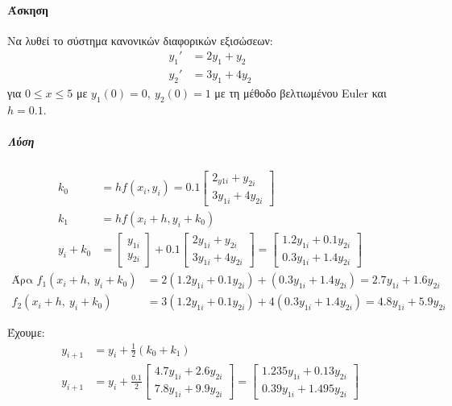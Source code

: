 \documentclass[11pt,a4paper,notitlepage,fleqn]{article}
\begin{document}
\paragraph{Άσκηση}
Να λυθεί το σύστημα κανονικών διαφορικών εξισώσεων:
\begin{align*}
	y_1' &= 2y_1 + y_2 \\
	y_2' &= 3y_1 + 4y_2
\end{align*} για \( 0 \leq x \leq 5 \) με \( y_1(0)=0,\ y_2(0)=1 \)
με τη μέθοδο βελτιωμένου Euler και \( h=0.1 \).
\subparagraph{Λύση}
\begin{align*}
	k_0 &= hf(x_i,y_i) = 0.1\left[\begin{matrix}
	2_{y1i}+y_{2i} \\
	3y_{1i}+4y_{2i}
	\end{matrix}\right] \\
	k_1 &= hf(x_i+h,y_i+k_0) \\
	y_i + k_0 &= \left[\begin{matrix}
	y_{1i}\\ y_{2i}
	\end{matrix}\right] + 0.1\left[\begin{matrix}
	2y_{1i} + y_{2i}\\
	3y_{1i}+4y_{2i}
	\end{matrix}\right] = \left[\begin{matrix}
	1.2y_{1i} + 0.1y_{2i}\\
	0.3y_{1i} + 1.4y_{2i}
	\end{matrix}\right]
\end{align*}
\begin{align*}
	\text{Άρα } f_1(x_i+h,\ y_i+k_0) &=
	2(1.2y_{1i}+0.1y_{2i}) + (0.3y_{1i}+1.4y_{2i}) =
	2.7y_{1i} + 1.6y_{2i} \\
	f_2(x_i+h,\ y_i+k_0) &=
	3(1.2y_{1i}+0.1y_{2i}) + 4(0.3y_{1i}+1.4y_{2i}) =
	4.8y_{1i}+5.9y_{2i}
\end{align*}

Έχουμε:
\begin{align*}
	y_{i+1} &= y_i + \frac{1}{2}(k_0+k_1)
	\\ y_{i+1} &= y_i + \frac{0.1}{2} \left[
	\begin{matrix}
	4.7y_{1i} + 2.6y_{2i} \\
	7.8y_{1i}+9.9y_{2i}
	\end{matrix}
	\right] = \left[\begin{matrix}
	1.235y_{1i} + 0.13y_{2i} \\
	0.39y_{1i} + 1.495y_{2i}
	\end{matrix}\right]
\end{align*}
\end{document}
